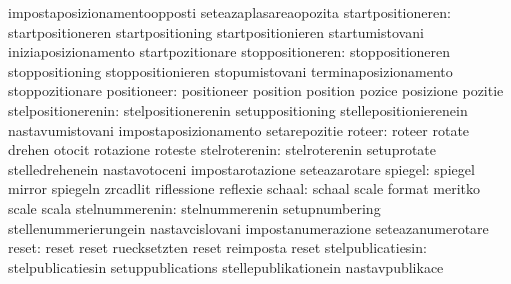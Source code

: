                                   impostaposizionamentoopposti     seteazaplasareaopozita
               startpositioneren: startpositioneren                startpositioning
                                  startpositionieren               startumistovani
                                  iniziaposizionamento             startpozitionare
                stoppositioneren: stoppositioneren                 stoppositioning
                                  stoppositionieren                stopumistovani
                                  terminaposizionamento            stoppozitionare
                     positioneer: positioneer                      position
                                  position                         pozice
                                  posizione                        pozitie
              stelpositionerenin: stelpositionerenin               setuppositioning
                                  stellepositionierenein           nastavumistovani
                                  impostaposizionamento            setarepozitie
                          roteer: roteer                           rotate
                                  drehen                           otocit
                                  rotazione                        roteste %
                   stelroterenin: stelroterenin                    setuprotate
                                  stelledrehenein                  nastavotoceni
                                  impostarotazione                 seteazarotare
                         spiegel: spiegel                          mirror
                                  spiegeln                         zrcadlit
                                  riflessione                      reflexie
                          schaal: schaal                           scale
                                  format                           meritko
                                  scale                            scala %
                  stelnummerenin: stelnummerenin                   setupnumbering
                                  stellenummerierungein            nastavcislovani
                                  impostanumerazione               seteazanumerotare
                           reset: reset                            reset
                                  ruecksetzten                     reset
                                  reimposta                        reset
               stelpublicatiesin: stelpublicatiesin                setuppublications
                                  stellepublikationein             nastavpublikace
